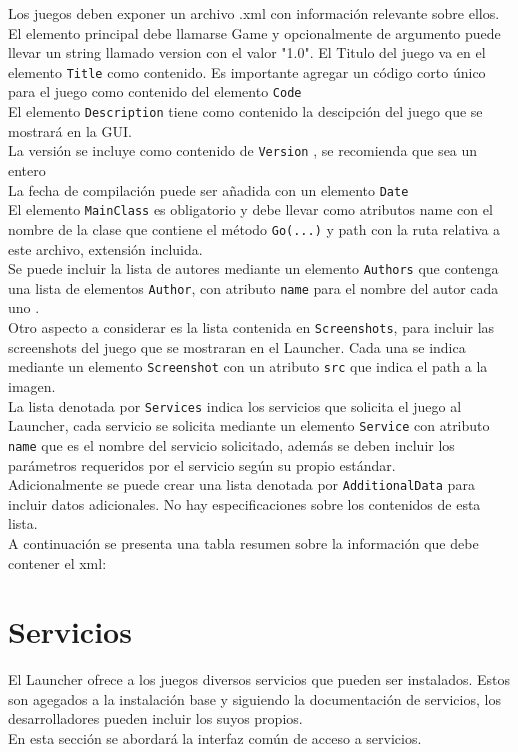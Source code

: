 \documentclass[language=spanish]{article}
\begin{document}
Los juegos deben exponer un archivo .xml con información relevante sobre ellos.
El elemento principal debe llamarse Game y opcionalmente de argumento puede llevar un string llamado version con el valor "1.0".
El Titulo del juego va en el elemento {\tt Title} como contenido. Es importante agregar un código corto único para el juego como contenido del elemento {\tt Code}\\
El elemento {\tt Description} tiene como contenido la descipción del juego que se mostrará en la GUI.\\
La versión se incluye como contenido de {\tt Version} , se recomienda que sea un entero\\
La fecha de compilación puede ser añadida con un elemento {\tt Date} \\
El elemento {\tt MainClass} es obligatorio y debe llevar como atributos name con el nombre de la clase que contiene el método {\tt Go(...)} y path con la ruta relativa a este archivo, extensión incluida.\\
Se puede incluir la lista de autores mediante un elemento {\tt Authors} que contenga una lista de elementos {\tt Author}, con atributo {\tt name} para el nombre del autor cada uno .\\
Otro aspecto a considerar es la lista contenida en {\tt Screenshots}, para incluir las screenshots del juego que se mostraran en el Launcher. Cada una se indica mediante un elemento {\tt Screenshot} con un atributo {\tt src} que indica el path a la imagen.\\
La lista denotada por {\tt Services} indica los servicios que solicita el juego al Launcher, cada servicio se solicita mediante un elemento {\tt Service} con atributo {\tt name} que es el nombre del servicio solicitado, además se deben incluir los parámetros requeridos por el servicio según su propio estándar.\\
Adicionalmente se puede crear una lista denotada por {\tt AdditionalData}  para incluir datos adicionales. No hay especificaciones sobre los contenidos de esta lista.\\ 
A continuación se presenta una tabla resumen sobre la información que debe contener el xml:



\section{Servicios}

El Launcher ofrece a los juegos diversos servicios que pueden ser instalados. Estos son agegados a la instalación base y siguiendo la documentación de servicios, los desarrolladores pueden incluir los suyos propios.\\
En esta sección se abordará la interfaz común de acceso a servicios.
\end{document}
